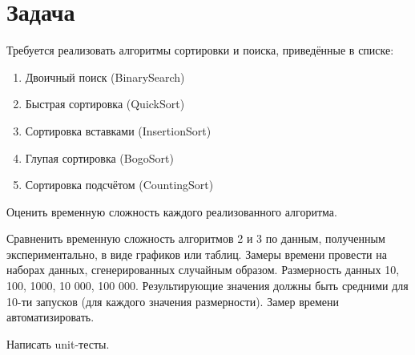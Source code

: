 \section*{Задача}

Требуется реализовать алгоритмы сортировки и поиска, приведённые в списке:

 \begin{enumerate}
    \item Двоичный поиск (BinarySearch)
    \item Быстрая сортировка (QuickSort)
    \item Сортировка вставками (InsertionSort)
    \item Глупая сортировка (BogoSort)
    \item Сортировка подсчётом (CountingSort)
 \end{enumerate}

Оценить временную сложность каждого реализованного алгоритма.

Сравненить временную сложность алгоритмов 2 и 3
по данным, полученным экспериментально, в виде графиков
или таблиц. Замеры времени провести на наборах данных,
сгенерированных случайным образом. Размерность данных 10, 100,
1000, 10 000, 100 000. Результирующие значения должны быть средними
для 10-ти запусков (для каждого значения размерности). Замер времени
автоматизировать.

Написать unit-тесты.
